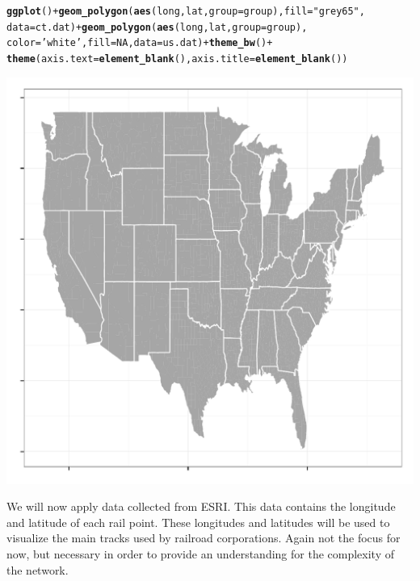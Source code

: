 \documentclass{article}\usepackage[]{graphicx}\usepackage[]{color}
\makeatletter
\def\maxwidth{ %
  \ifdim\Gin@nat@width>\linewidth
    \linewidth
  \else
    \Gin@nat@width
  \fi
}
\newcommand{\hlnum}[1]{\textcolor[rgb]{0.686,0.059,0.569}{#1}}%
\newcommand{\hlstr}[1]{\textcolor[rgb]{0.192,0.494,0.8}{#1}}%
\newcommand{\hlopt}[1]{\textcolor[rgb]{0,0,0}{#1}}%
\newcommand{\hlstd}[1]{\textcolor[rgb]{0.345,0.345,0.345}{#1}}%
\newcommand{\hlkwc}[1]{\textcolor[rgb]{0.333,0.667,0.333}{#1}}%
\newcommand{\hlkwd}[1]{\textcolor[rgb]{0.737,0.353,0.396}{\textbf{#1}}}%
\newenvironment{kframe}{%
 \def\at@end@of@kframe{}%
 \ifinner\ifhmode%
  \def\at@end@of@kframe{\end{minipage}}%
  \begin{minipage}{\columnwidth}%
 \fi\fi%
 \def\FrameCommand##1{\hskip\@totalleftmargin \hskip-\fboxsep
 \colorbox{shadecolor}{##1}\hskip-\fboxsep
     \hskip-\linewidth \hskip-\@totalleftmargin \hskip\columnwidth}%
 \MakeFramed {\advance\hsize-\width
   \@totalleftmargin\z@ \linewidth\hsize
   \@setminipage}}%
 {\par\unskip\endMakeFramed%
 \at@end@of@kframe}
\newenvironment{knitrout}{}{} %
\makeatother
\begin{document}
\begin{knitrout}
\color{fgcolor}\begin{kframe}
\begin{alltt}
\hlkwd{ggplot}\hlstd{()} \hlopt{+} \hlkwd{geom_polygon}\hlstd{(}\hlkwd{aes}\hlstd{(long,lat,} \hlkwc{group}\hlstd{=group),} \hlkwc{fill}\hlstd{=}\hlstr{"grey65"}\hlstd{,}
  \hlkwc{data}\hlstd{=ct.dat)} \hlopt{+} \hlkwd{geom_polygon}\hlstd{(}\hlkwd{aes}\hlstd{(long,lat,} \hlkwc{group}\hlstd{=group),}
  \hlkwc{color}\hlstd{=}\hlstr{'white'}\hlstd{,} \hlkwc{fill}\hlstd{=}\hlnum{NA}\hlstd{,} \hlkwc{data}\hlstd{=us.dat)} \hlopt{+} \hlkwd{theme_bw}\hlstd{()} \hlopt{+}
  \hlkwd{theme}\hlstd{(}\hlkwc{axis.text} \hlstd{=} \hlkwd{element_blank}\hlstd{(),} \hlkwc{axis.title}\hlstd{=}\hlkwd{element_blank}\hlstd{())}
\end{alltt}
\end{kframe}

{\centering \includegraphics[width=\maxwidth]{./unnamed-chunk-11-1} 

}



\end{knitrout}
\newpage

We will now apply data collected from ESRI.  This data contains the longitude and latitude of each rail point.  These longitudes and latitudes will be used to visualize the main tracks used by railroad corporations. Again not the focus for now, but necessary in order to provide an understanding for the complexity of the network. \\
\end{document}
